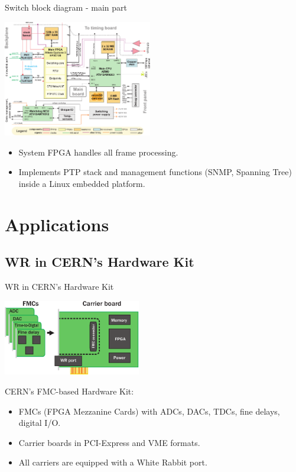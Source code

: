 \documentclass[compress,red]{beamer}
\begin{document}
\begin{frame}{Switch block diagram - main part}
\begin{center}
\includegraphics[width=6.5cm]{sw_block.pdf}
\end{center}
\begin{itemize}
\item System FPGA handles all frame processing.
\item Implements PTP stack and management functions (SNMP, Spanning Tree) 
   inside a Linux embedded platform.
\end{itemize}
\end{frame}

\section{Applications}

\subsection{WR in CERN's Hardware Kit}

\begin{frame}{WR in CERN's Hardware Kit}
\begin{center}

  \includegraphics[width=6cm]{shw_kit.pdf}

  \begin{block}{CERN's FMC-based Hardware Kit:}
    \begin{itemize}
    \item FMCs (FPGA Mezzanine Cards) with ADCs, DACs, TDCs, fine delays, digital I/O.
    \item Carrier boards in PCI-Express and VME formats.
    \item All carriers are equipped with a White Rabbit port.
    \end{itemize}
  \end{block}

\end{center}
\end{frame}
\end{document}
